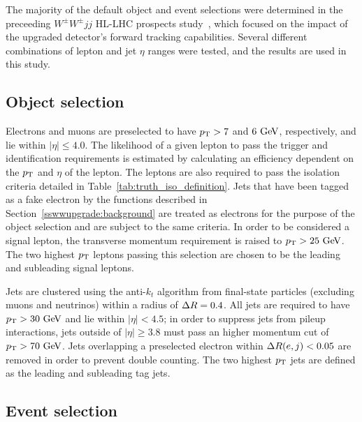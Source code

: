 The majority of the default object and event selections were determined in the preceeding $W^{\pm}W^{\pm}jj$ HL-LHC prospects study~\cite{2017.ssww-upgrade}, which focused on the impact of the upgraded detector's forward tracking capabilities.
Several different combinations of lepton and jet $\eta$ ranges were tested, and the results are used in this study. 

\subsection{Object selection}\label{sswwupgrade:object_selection}
Electrons and muons are preselected to have $p_{\mathrm{T}} > 7$ and $6\gev$, respectively, and lie within $|\eta| \le 4.0$.
The likelihood of a given lepton to pass the trigger and identification requirements is estimated by calculating an efficiency dependent on the $p_{\mathrm{T}}$ and $\eta$ of the lepton.
The leptons are also required to pass the isolation criteria detailed in Table~\ref{tab:truth_iso_definition}.
Jets that have been tagged as a fake electron by the functions described in Section~\ref{sswwupgrade:background} are treated as electrons for the purpose of the object selection and are subject to the same criteria.
In order to be considered a signal lepton, the transverse momentum requirement is raised to $\pt > 25\gev$.
The two highest $p_{\mathrm{T}}$ leptons passing this selection are chosen to be the leading and subleading signal leptons.

Jets are clustered using the anti-$k_t$ algorithm from final-state particles (excluding muons and neutrinos) within a radius of $\Delta R = 0.4$.
All jets are required to have $\pt > 30\gev$ and lie within $|\eta| < 4.5$; in order to suppress jets from pileup interactions, jets outside of $|\eta| \ge 3.8$ must pass an higher momentum cut of $\pt > 70\gev$.
Jets overlapping a preselected electron within $\Delta R(e,j) < 0.05$ are removed in order to prevent double counting.
The two highest $p_{\mathrm{T}}$ jets are defined as the leading and subleading tag jets.


\subsection{Event selection}\label{sswwupgrade:event_selection}

